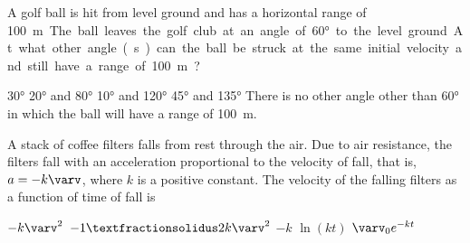 \documentclass{../../oss-classkick-exam}
\begin{document}
\begin{multicols*}{2}
\begin{questions}
    \question A golf ball is hit from level ground and has a horizontal range of
    \SI{100}\metre. The ball leaves the golf club at an angle of \ang{60} to
    the level ground. At what other angle(s) can the ball be struck at the same
    initial velocity and still have a range of \SI{100}\metre?
    \begin{center}
    \end{center}
    \begin{choices}
      \choice\ang{30}
      \choice\ang{20} and \ang{80}
      \choice\ang{10} and \ang{120}
      \choice\ang{45} and \ang{135}
      \choice There is no other angle other than \ang{60} in which the ball will
      have a range of \SI{100}\metre.
    \end{choices}
    \vspace{.7in}
      
    \question A stack of coffee filters falls from rest through the air. Due to
    air resistance, the filters fall with an acceleration proportional to the
    velocity of fall, that is, $a=-k\varv$, where $k$ is a positive constant.
    The velocity of the falling filters as a function of time of fall is
    \begin{choices}
      \choice $-k\varv^2$
      \choice $-1⁄2k\varv^2$
      \choice $-k$
      \choice $\ln(kt)$
      \choice $\varv_0e^{-kt}$
    \end{choices}
    

\end{questions}
\end{multicols*}
\end{document}
